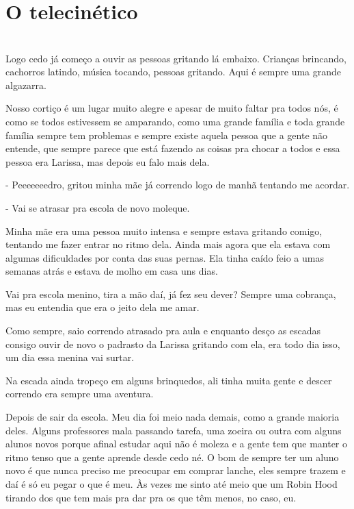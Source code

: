 \newpage


\ifdefined\useChapters
\chapter{O telecinético}
\else
\chapter{}
\fi

Logo cedo já começo a ouvir as pessoas gritando lá embaixo. Crianças brincando, cachorros latindo, música tocando, pessoas gritando. Aqui é sempre uma grande algazarra.

Nosso cortiço é um lugar muito alegre e apesar de muito faltar pra todos nós, é como se todos estivessem se amparando, como uma grande família e toda grande família sempre tem problemas e sempre existe aquela pessoa que a gente não entende, que sempre parece que está fazendo as coisas pra chocar a todos e essa pessoa era Larissa, mas depois eu falo mais dela.

- Peeeeeeedro, gritou minha mãe já correndo logo de manhã tentando me acordar.

- Vai se atrasar pra escola de novo moleque.

Minha mãe era uma pessoa muito intensa e sempre estava gritando comigo, tentando me fazer entrar no ritmo dela. Ainda mais agora que ela estava com algumas dificuldades por conta das suas pernas. Ela tinha caído feio a umas semanas atrás e estava de molho em casa uns dias.

Vai pra escola menino, tira a mão daí, já fez seu dever? Sempre uma cobrança, mas eu entendia que era o jeito dela me amar.

Como sempre, saio correndo atrasado pra aula e enquanto desço as escadas consigo ouvir de novo o padrasto da Larissa gritando com ela, era todo dia isso, um dia essa menina vai surtar.

Na escada ainda tropeço em alguns brinquedos, ali tinha muita gente e descer correndo era sempre uma aventura.

Depois de sair da escola. Meu dia foi meio nada demais, como a grande maioria deles. Alguns professores mala passando tarefa, uma zoeira ou outra com alguns alunos novos porque afinal estudar aqui não é moleza e a gente tem que manter o ritmo tenso que a gente aprende desde cedo né. O bom de sempre ter um aluno novo é que nunca preciso me preocupar em comprar lanche, eles sempre trazem e daí é só eu pegar o que é meu. Às vezes me sinto até meio que um Robin Hood tirando dos que tem mais pra dar pra os que têm menos, no caso, eu.


